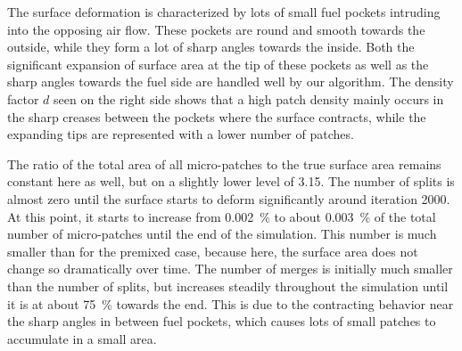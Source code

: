 %
The surface deformation is characterized by lots of small fuel pockets intruding
into the opposing air flow.
%
These pockets are round and smooth towards the outside, while they form a lot of
sharp angles towards the inside.
%
Both the significant expansion of surface area at the tip of these pockets as
well as the sharp angles towards the fuel side are handled well by our
algorithm.
%
The density factor $d$ seen on the right side shows that a high patch density
mainly occurs in the sharp creases between the pockets where the surface
contracts, while the expanding tips are represented with a lower number of
patches.
%

%
The ratio of the total area of all micro-patches to the true surface area
remains constant here as well, but on a slightly lower level of \num{3.15}.
%
The number of splits is almost zero until the surface starts to deform
significantly around iteration \num{2000}.
%
At this point, it starts to increase from \SI{0.002}{\percent} to about
\SI{0.003}{\percent} of the total number of micro-patches until the end of the
simulation.
%
This number is much smaller than for the premixed case, because here, the
surface area does not change so dramatically over time.
%
The number of merges is initially much smaller than the number of splits, but
increases steadily throughout the simulation until it is at about
\SI{75}{\percent} towards the end.
%
This is due to the contracting behavior near the sharp angles in between fuel
pockets, which causes lots of small patches to accumulate in a small area.
%
%
